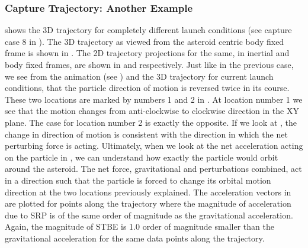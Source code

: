 \subsubsection{Capture Trajectory: Another Example}
 shows the 3D trajectory for completely different launch conditions (see capture case 8 in ). The 3D trajectory as viewed from the asteroid centric body fixed frame is shown in . The 2D trajectory projections for the same, in inertial and body fixed frames, are shown in  and  respectively. Just like in the previous case, we see from the animation (see ) and the 3D trajectory for current launch conditions, that the particle direction of motion is reversed twice in its course. These two locations are marked by numbers 1 and 2 in . At location number 1 we see that the motion changes from anti-clockwise to clockwise direction in the XY plane. The case for location number 2 is exactly the opposite. If we look at , the change in direction of motion is consistent with the direction in which the net perturbing force is acting. Ultimately, when we look at the net acceleration acting on the particle in , we can understand how exactly the particle would orbit around the asteroid. The net force, gravitational and perturbations combined, act in a direction such that the particle is forced to change its orbital motion direction at the two locations previously explained. The acceleration vectors in  are plotted for points along the trajectory where the magnitude of acceleration due to \gls{SRP} is of the same order of magnitude as the gravitational acceleration. Again, the magnitude of \gls{STBE} is 1.0 order of magnitude smaller than the gravitational acceleration for the same data points along the trajectory.
